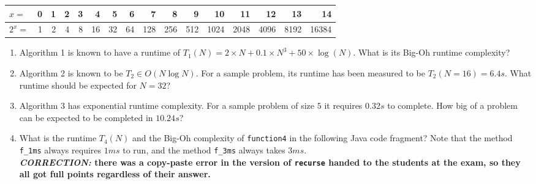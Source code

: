 \documentclass[a4paper]{article}
\begin{document}
\begin{tabular}{|l|r|r|r|r|r|r|r|r|r|r|r|r|r|r|r|}
  \hline
  $x=$   & 0 & 1 & 2 & 3 & 4 & 5 & 6 & 7 & 8 & 9 & 10 & 11 & 12 & 13 & 14 \\
  \hline
  $2^x=$ & 1 & 2 & 4 & 8 & 16 & 32 & 64 & 128 & 256 & 512 & 1024 & 2048 & 4096 & 8192 & 16384 \\
  \hline
\end{tabular}

\begin{enumerate}
\item
  Algorithm 1 is known to have a runtime of $T_1(N) = 2 \times N + 0.1 \times N^3 + 50 \times \log(N)$.
  What is its Big-Oh runtime complexity?
\item
  Algorithm 2 is known to be $T_2 \in O(N \log N)$.
  For a sample problem, its runtime has been measured to be $T_2(N=16) = 6.4s$.
  What runtime should be expected for $N=32$?
\item
  Algorithm 3 has exponential runtime complexity.
  For a sample problem of size $5$ it requires $0.32s$ to complete.
  How big of a problem can be expected to be completed in $10.24s$?
\item
  What is the runtime $T_4(N)$ and the Big-Oh complexity of \texttt{function4} in the following Java code fragment?
  Note that the method \texttt{f\_1ms} always requires $1ms$ to run, and the method \texttt{f\_3ms} always takes $3ms$.\\
  \textbf{\emph{CORRECTION:} there was a copy-paste error in the version of \texttt{recurse} handed to the students at the exam, so they all got full points regardless of their answer.}
  \small
  \normalsize
\end{enumerate}
\end{document}
